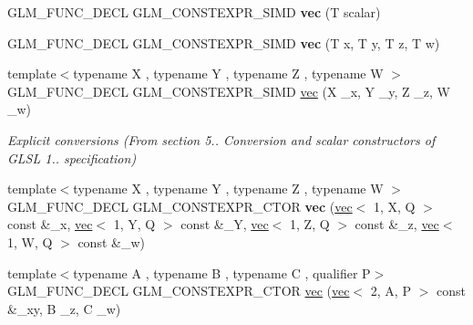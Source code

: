 \begin{DoxyCompactItemize}
G\+L\+M\+\_\+\+F\+U\+N\+C\+\_\+\+D\+E\+CL G\+L\+M\+\_\+\+C\+O\+N\+S\+T\+E\+X\+P\+R\+\_\+\+S\+I\+MD {\bfseries vec} (T scalar)
\item 
\mbox{\label{structglm_1_1vec_3_014_00_01T_00_01Q_01_4_a780f2ba10078d7f0dd8348e288042aac}} 
G\+L\+M\+\_\+\+F\+U\+N\+C\+\_\+\+D\+E\+CL G\+L\+M\+\_\+\+C\+O\+N\+S\+T\+E\+X\+P\+R\+\_\+\+S\+I\+MD {\bfseries vec} (T x, T y, T z, T w)
\item 
\mbox{\label{structglm_1_1vec_3_014_00_01T_00_01Q_01_4_a5ed4d92395313bc109f2363d8cc29d86}} 
{\footnotesize template$<$typename X , typename Y , typename Z , typename W $>$ }\\G\+L\+M\+\_\+\+F\+U\+N\+C\+\_\+\+D\+E\+CL G\+L\+M\+\_\+\+C\+O\+N\+S\+T\+E\+X\+P\+R\+\_\+\+S\+I\+MD \hyperlink{structglm_1_1vec_3_014_00_01T_00_01Q_01_4_a5ed4d92395313bc109f2363d8cc29d86}{vec} (X \+\_\+x, Y \+\_\+y, Z \+\_\+z, W \+\_\+w)
\begin{DoxyCompactList}\small\item\em Explicit conversions (From section 5.. Conversion and scalar constructors of G\+L\+SL 1.. specification) \end{DoxyCompactList}\item 
\mbox{\label{structglm_1_1vec_3_014_00_01T_00_01Q_01_4_ac1010f23f9fb2dce17ac5dcba8a37dab}} 
{\footnotesize template$<$typename X , typename Y , typename Z , typename W $>$ }\\G\+L\+M\+\_\+\+F\+U\+N\+C\+\_\+\+D\+E\+CL G\+L\+M\+\_\+\+C\+O\+N\+S\+T\+E\+X\+P\+R\+\_\+\+C\+T\+OR {\bfseries vec} (\hyperlink{structglm_1_1vec}{vec}$<$ 1, X, Q $>$ const \&\+\_\+x, \hyperlink{structglm_1_1vec}{vec}$<$ 1, Y, Q $>$ const \&\+\_\+Y, \hyperlink{structglm_1_1vec}{vec}$<$ 1, Z, Q $>$ const \&\+\_\+z, \hyperlink{structglm_1_1vec}{vec}$<$ 1, W, Q $>$ const \&\+\_\+w)
\item 
\mbox{\label{structglm_1_1vec_3_014_00_01T_00_01Q_01_4_a973c9293d62029453e5e2619061f84e8}} 
{\footnotesize template$<$typename A , typename B , typename C , qualifier P$>$ }\\G\+L\+M\+\_\+\+F\+U\+N\+C\+\_\+\+D\+E\+CL G\+L\+M\+\_\+\+C\+O\+N\+S\+T\+E\+X\+P\+R\+\_\+\+C\+T\+OR \hyperlink{structglm_1_1vec_3_014_00_01T_00_01Q_01_4_a973c9293d62029453e5e2619061f84e8}{vec} (\hyperlink{structglm_1_1vec}{vec}$<$ 2, A, P $>$ const \&\+\_\+xy, B \+\_\+z, C \+\_\+w)

\end{DoxyCompactItemize}
